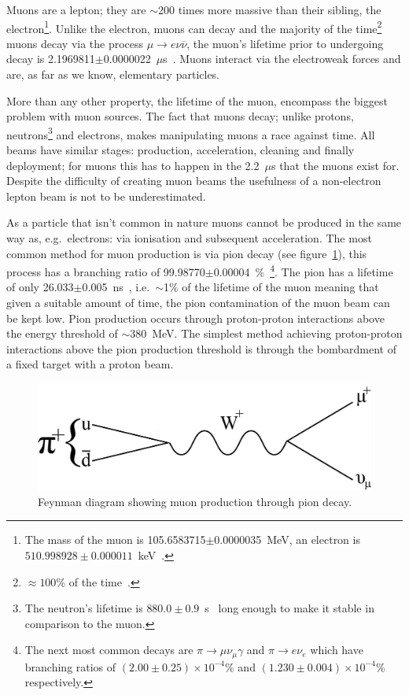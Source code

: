 Muons are a lepton; they are \(\sim\)200 times more massive than their sibling, the electron\footnote{The mass of the muon is 105.6583715\(\pm\)0.0000035~MeV, an electron is \( 510.998928\pm0.000011 \)~keV~\cite{pdg}.}. Unlike the electron, muons can decay and the majority of the time\footnote{\(\approx100\%\) of the time~\cite{pdg}.} muons decay via the process \(\mu\rightarrow e\nu\overline{\nu}\), the muon's lifetime prior to undergoing decay is 2.1969811\( \pm \)0.0000022~\( \mu \)s~\cite{pdg}. Muons interact via the electroweak forces and are, as far as we know, elementary particles.

More than any other property, the lifetime of the muon, encompass the biggest problem with muon sources. The fact that muons decay; unlike protons, neutrons\footnote{The neutron's lifetime is \(880.0\pm0.9\)~s~\cite{pdg} long enough to make it stable in comparison to the muon.} and electrons, makes manipulating muons a race against time. All beams have similar stages: production, acceleration, cleaning and finally deployment; for muons this has to happen in the 2.2~\(\mu\)s that the muons exist for. Despite the difficulty of creating muon beams the usefulness of a non-electron lepton beam is not to be underestimated.

As a particle that isn't common in nature muons cannot be produced in the same way as, e.g.\ electrons: via ionisation and subsequent acceleration. The most common method for muon production is via pion decay (see figure~\ref{fig:pion_decay_feyman}), this process has a branching ratio of 99.98770$\pm$0.00004~\%~\cite{pdg}\footnote{The next most common decays are \( \pi\rightarrow\mu\nu_{\mu}\gamma \) and \( \pi\rightarrow e \nu_e \) which have branching ratios of \( (2.00\pm0.25)\times10^{-4} \)\% and \( (1.230\pm0.004)\times10^{-4} \)\% respectively.}. The pion has a lifetime of only 26.033\(\pm\)0.005~ns~\cite{pdg}, i.e.\ \( \sim \)1\% of the lifetime of the muon meaning that given a suitable amount of time, the pion contamination of the muon beam can be kept low. Pion production occurs through proton-proton interactions above the energy threshold of \( \sim380 \)~MeV. The simplest method achieving proton-proton interactions above the pion production threshold is through the bombardment of a fixed target with a proton beam.

\begin{figure}[hptb]
  \centering  
    \includegraphics[scale=0.8]{images/pion_decay_feyman.png}
  \caption{Feynman diagram showing muon production through pion decay.}
  \label{fig:pion_decay_feyman}
\end{figure}

